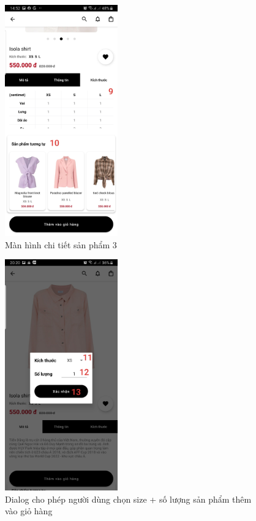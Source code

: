 \documentclass[12pt]{article}
\begin{document}
\begin{figure}[H]
    \centering
    \includegraphics[height=10cm]{images/23.png}
    \caption{Màn hình chi tiết sản phẩm 3}
\end{figure}

\begin{figure}[H]
    \centering
    \includegraphics[height=10cm]{images/24.png}
    \caption{Dialog cho phép người dùng chọn size + số lượng sản phẩm thêm vào giỏ hàng}
\end{figure}
\end{document}
